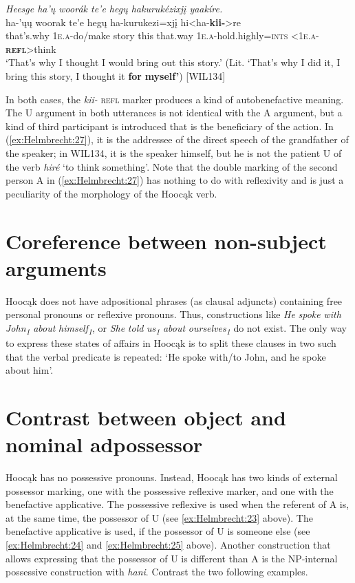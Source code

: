 \documentclass[output=paper]{langscibook}
\begin{document}
\ea  
\label{ex:Helmbrecht:29}
\textit{Heesge ha'ų woorák te'e hegų hakurukézixjį yaakíre.}\\
  {ha-'ųų} {woorak} {te'e} {hegų}   {ha-kurukezi=xjį} {hi<ha-\textbf{kii-}>re}\\
  {that's.why} {\textsc{1e.a}-do/make} {story} {this} {that.way}  {\textsc{1e.a}-hold.highly=\textsc{ints}} {<\textsc{1e.a}-\textbf{\textsc{refl}}>think}\\
  \glt `That's why I thought I would bring out this story.' (Lit. `That's why I did it, I bring this story, I thought it \textbf{for} \textbf{myself'}) [WIL134]
\z 

In both cases, the \textit{kii-} \textsc{refl} marker produces a kind of autobenefactive meaning. The U argument in both utterances is not identical with the A argument, but a kind of third participant is introduced that is the beneficiary of the action. In (\ref{ex:Helmbrecht:27}), it is the addressee of the direct speech of the grandfather of the speaker; in WIL134, it is the speaker himself, but he is not the patient U of the verb \textit{hiré} `to think something'. Note that the double marking of the second person A in (\ref{ex:Helmbrecht:27}) has nothing to do with reflexivity and is just a peculiarity of the morphology of the Hoocąk verb.

\section{Coreference between non-subject arguments}\label{sec:Helmbrecht:6}

Hoocąk does not have adpositional phrases (as clausal adjuncts) containing free personal pronouns or reflexive pronouns. Thus, constructions like \textit{He} \textit{spoke} \textit{with} \textit{John\textsubscript{1}} \textit{about} \textit{himself\textsubscript{1}}, or \textit{She} \textit{told} \textit{us\textsubscript{1}} \textit{about} \textit{ourselves\textsubscript{1}} do not exist. The only way to express these states of affairs in Hoocąk is to split these clauses in two such that the verbal predicate is repeated: `He spoke with/to John, and he spoke about him'. 

\section{Contrast between object and nominal adpossessor}\label{sec:Helmbrecht:7}

Hoocąk has no possessive pronouns. Instead, Hoocąk has two kinds of external possessor marking, one with the possessive reflexive marker, and one with the benefactive applicative. The possessive reflexive is used when the referent of A is, at the same time, the possessor of U (see \ref{ex:Helmbrecht:23} above). The benefactive applicative is used, if the possessor of U is someone else (see \ref{ex:Helmbrecht:24} and \ref{ex:Helmbrecht:25} above). Another construction that allows expressing that the possessor of U is different than A is the NP-internal possessive construction with \textit{hani}. Contrast the two following examples.
\end{document}
